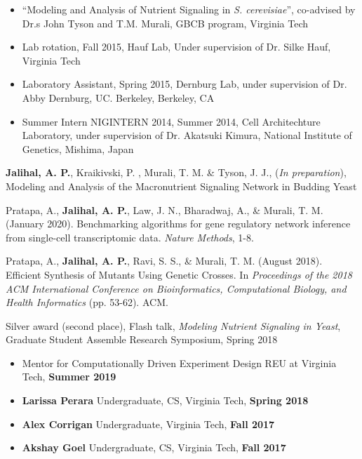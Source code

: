 \documentclass[10pt,a4paper,ragged2e]{altacv}
\begin{document}
\begin{itemize}
\item ``Modeling and Analysis of Nutrient Signaling in \textit{S. cerevisiae}'', co-advised by Dr.s John Tyson and T.M. Murali, GBCB program, Virginia Tech
  \item Lab rotation, Fall 2015, Hauf Lab, Under supervision of Dr. Silke Hauf, Virginia Tech
  \item Laboratory Assistant, Spring 2015, Dernburg Lab, under supervision of Dr. Abby Dernburg, UC. Berkeley, Berkeley, CA
  \item Summer Intern  NIGINTERN 2014, Summer 2014, Cell Architechture Laboratory, under supervision of Dr. Akatsuki Kimura, National Institute of Genetics, Mishima, Japan
\end{itemize}

\begin{etaremune}
\item \textbf{Jalihal, A. P.}, Kraikivski, P. , Murali, T. M. \& Tyson, J. J., (\textit{In preparation}), Modeling and Analysis of the Macronutrient Signaling Network in Budding Yeast
\item Pratapa, A., \textbf{Jalihal, A. P.}, Law, J. N., Bharadwaj, A., \& Murali, T. M. (January 2020). Benchmarking algorithms for gene regulatory network inference from single-cell transcriptomic data. \textit{Nature Methods}, 1-8.
\item Pratapa, A., \textbf{Jalihal, A. P.}, Ravi, S. S., \& Murali, T. M. (August 2018). Efficient Synthesis of Mutants Using Genetic Crosses. In \textit{Proceedings of the 2018 ACM International Conference on Bioinformatics, Computational Biology, and Health Informatics} (pp. 53-62). ACM.
\end{etaremune}


Silver award (second place), Flash talk, \textit{Modeling Nutrient Signaling in Yeast}, Graduate Student Assemble Research Symposium, Spring 2018
\clearpage

\begin{itemize}
  \item Mentor for Computationally Driven Experiment Design REU at Virginia Tech, \textbf{Summer 2019}
  \item \textbf{Larissa Perara} Undergraduate, CS, Virginia Tech,   \textbf{Spring 2018}
  \item \textbf{Alex Corrigan} Undergraduate, Virginia Tech,  \textbf{Fall 2017}    
  \item \textbf{Akshay Goel} Undergraduate, CS, Virginia Tech,  \textbf{Fall 2017}
\end{itemize}
\end{document}
